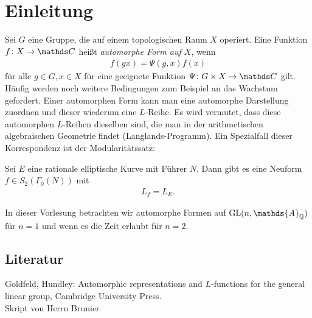 \chapter*{Einleitung}
Sei $G$ eine Gruppe, die auf einem topologischen Raum $X$ operiert.
Eine Funktion $f\colon X \to \C$ heißt \emph{automorphe Form auf $X$}, wenn
\begin{align*}
f(gx)=  \Psi(g,x) f(x)
\end{align*}
für alle $g\in G,x\in X$ für eine geeignete Funktion $\Psi \colon G \times X \to \C $ gilt.
Häufig werden noch weitere Bedingungen zum Beispiel an das Wachstum gefordert.
Einer automorphen Form kann man eine automorphe Darstellung zuordnen und dieser wiederum eine $L$-Reihe.
Es wird vermutet, dass diese automorphen $L$-Reihen dieselben sind, die man in der arithmetischen algebraischen Geometrie findet (Langlands-Programm).
Ein Spezialfall dieser Korrespondenz ist der Modularitätssatz:
\begin{satz}
Sei $E$ eine rationale elliptische Kurve mit Führer $N$.
Dann gibt es eine Neuform $f\in S_2(\Gamma_0(N))$ mit
\begin{align*}
L_f=L_E.
\end{align*}
\end{satz}
In dieser Vorlesung betrachten wir automorphe Formen auf $\GL(n,\mathds{A}_\Q)$ für $n=1$ und wenn es die Zeit erlaubt für $n=2$.
\section*{Literatur}
Goldfeld, Hundley: Automorphic representations and $L$-functions for the general linear group, Cambridge University Press.\\
Skript von Herrn Brunier